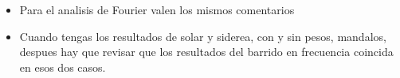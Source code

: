 \begin{itemize}
\begin{itemize}
\begin{itemize}

			\end{itemize}




	\end{itemize}

	\item Para el analisis de Fourier valen los mismos comentarios

	\item Cuando tengas los resultados de solar y siderea, con y sin pesos, mandalos, despues hay que revisar que los resultados del barrido en frecuencia coincida en esos dos casos.

	\end{itemize}